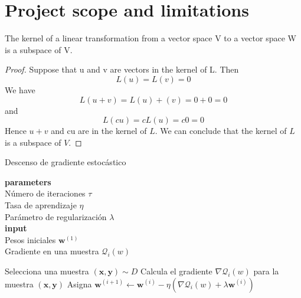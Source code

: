 \section{Project scope and limitations}
\lipsum[1]
\begin{theorem}
The kernel of a linear transformation from a vector space V to a vector space W is a subspace of V.
\end{theorem}
\begin{proof}
    Suppose that u and v are vectors in the kernel of L.  Then 
    \begin{equation}
        L(u) = L(v) = 0
    \end{equation}
    We have
    \begin{equation}
        L(u + v) = L(u) + (v) = 0 + 0 = 0 
    \end{equation}
    and
    \begin{equation}
        L(cu) = cL(u) = c0 = 0
    \end{equation}
    Hence $u + v$ and cu are in the kernel of $L$. We can conclude that the kernel of $L$ is a subspace of $V$.
\end{proof}
\lipsum[1]

\begin{algorithm}[H]
    \caption{Descenso de gradiente estocástico}\label{alg:SGD}
    \hspace*{\algorithmicindent} \textbf{parameters} \\
    \hspace*{\algorithmicindent}\hspace*{\algorithmicindent} Número de iteraciones $\tau$ \\
    \hspace*{\algorithmicindent}\hspace*{\algorithmicindent} Tasa de aprendizaje $\eta$ \\
    \hspace*{\algorithmicindent}\hspace*{\algorithmicindent} Parámetro de regularización $\lambda$ \\
    \hspace*{\algorithmicindent} \textbf{input} \\
    \hspace*{\algorithmicindent}\hspace*{\algorithmicindent} Pesos iniciales $\mathbf{w}^{(1)}$ \\
    \hspace*{\algorithmicindent}\hspace*{\algorithmicindent} Gradiente en una muestra $\mathcal{Q}_i(w)$
    \begin{algorithmic}[1]
        \State Selecciona una muestra $(\mathbf{x}, \mathbf{y})\sim D$
        \State Calcula el gradiente $\nabla\mathcal{Q}_i(w)$ para la muestra $(\mathbf{x}, \mathbf{y})$
        \State Asigna $\mathbf{w}^{(i+1)} \gets \mathbf{w}^{(i)} - \eta(\nabla\mathcal{Q}_i(w) + \lambda\mathbf{w}^{(i)})$
        \EndFor
        \EndProcedure
    \end{algorithmic}
\end{algorithm}

